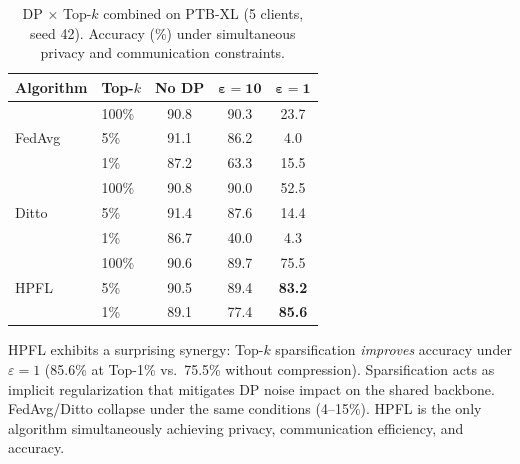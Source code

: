 \documentclass[conference]{IEEEtran}
\begin{document}
\begin{table}[htbp]
\centering
\caption{DP $\times$ Top-$k$ combined on PTB-XL (5 clients, seed 42). Accuracy (\%) under simultaneous privacy and communication constraints.}
\label{tab:dp_topk}
\small
\begin{tabular}{llccc}
\toprule
\textbf{Algorithm} & \textbf{Top-$k$} & \textbf{No DP} & $\boldsymbol{\varepsilon{=}10}$ & $\boldsymbol{\varepsilon{=}1}$ \\
\midrule
\multirow{3}{*}{FedAvg} & 100\% & 90.8 & 90.3 & 23.7 \\
 & 5\% & 91.1 & 86.2 & 4.0 \\
 & 1\% & 87.2 & 63.3 & 15.5 \\
\midrule
\multirow{3}{*}{Ditto} & 100\% & 90.8 & 90.0 & 52.5 \\
 & 5\% & 91.4 & 87.6 & 14.4 \\
 & 1\% & 86.7 & 40.0 & 4.3 \\
\midrule
\multirow{3}{*}{HPFL} & 100\% & 90.6 & 89.7 & 75.5 \\
 & 5\% & 90.5 & 89.4 & \textbf{83.2} \\
 & 1\% & 89.1 & 77.4 & \textbf{85.6} \\
\bottomrule
\end{tabular}

\vspace{1mm}
\footnotesize{HPFL exhibits a surprising synergy: Top-$k$ sparsification \textit{improves} accuracy under $\varepsilon{=}1$ (85.6\% at Top-1\% vs.\ 75.5\% without compression). Sparsification acts as implicit regularization that mitigates DP noise impact on the shared backbone. FedAvg/Ditto collapse under the same conditions (4--15\%). HPFL is the only algorithm simultaneously achieving privacy, communication efficiency, and accuracy.}
\end{table}

\end{document}
